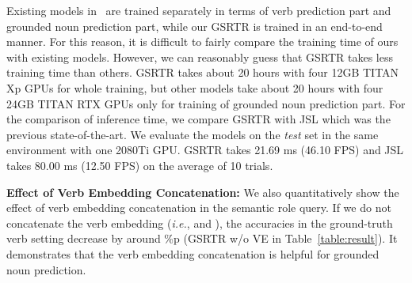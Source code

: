 Existing models in~\cite{pratt2020grounded} are trained separately in terms of verb prediction part and grounded noun prediction part, while our GSRTR is trained in an end-to-end manner.
For this reason, it is difficult to fairly compare the training time of ours with existing models.
However, we can reasonably guess that GSRTR takes less training time than others.
GSRTR takes about 20 hours with four 12GB TITAN Xp GPUs for whole training, but other models take about 20 hours with four 24GB TITAN RTX GPUs only for training of grounded noun prediction part.
For the comparison of inference time, we compare GSRTR with JSL which was the previous state-of-the-art.
We evaluate the models on the \emph{test} set in the same environment with one 2080Ti GPU.
GSRTR takes 21.69 ms (46.10 FPS) and JSL takes 80.00 ms (12.50 FPS) on the average of 10 trials.
\label{exp:result}

\noindent
\textbf{Effect of Verb Embedding Concatenation:}
We also quantitatively show the effect of verb embedding concatenation in the semantic role query.
If we do not concatenate the verb embedding (\emph{i.e.},  and ), the accuracies in the ground-truth verb setting decrease by around \%p  (GSRTR w/o VE in Table~\ref{table:result}).
It demonstrates that the verb embedding concatenation is helpful for grounded noun prediction.


